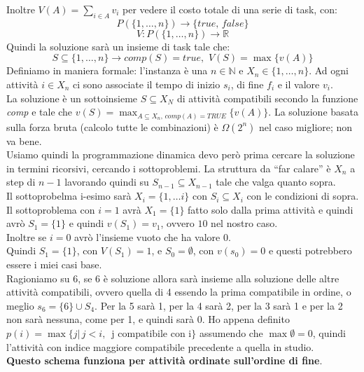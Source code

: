 \documentclass[a4paper,12pt, oneside]{book}
\begin{document}
Inoltre $V(A)=\sum_{i\in A}v_i$ per vedere il costo totale di una
serie di task, con:
\[P(\{1,\ldots, n\})\to \{true,\,false\}\]
\[V:P(\{1,\ldots, n\})\to \mathbb{R}\]
Quindi la soluzione sarà un insieme di task tale che:
\[S\subseteq \{1,\ldots, n\} \to
  comp(S)=true,\,\, V(S)=\max\{v(A)\}\]
Definiamo in maniera formale:
l'instanza è una $n\in\mathbb{N}$ e $X_n\in\{1,\ldots,n\}$. Ad ogni
attività $i\in X_n$ ci sono associate il tempo di inizio $s_i$, di fine $f_i$
e il valore $v_i$.\\
La soluzione è un sottoinsieme $S\subseteq X_N$ di attività
compatibili secondo la funzione \textit{comp} e tale che
$v(S)=\max_{A\subseteq X_n,\, comp(A)=TRUE}\{v(A)\}$.
La soluzione basata sulla forza bruta (calcolo tutte le combinazioni)
è $\Omega(2^n)$ nel caso migliore; non va bene.\\
Usiamo quindi la programmazione dinamica devo però prima cercare la
soluzione in termini ricorsivi, cercando i sottoproblemi. La struttura
da ``far calare'' è $X_n$ a step di $n-1$ lavorando quindi su
$S_{n-1}\subseteq X_{n-1}$ tale che valga quanto sopra.\\ Il
sottoprobelma i-esimo sarà $X_i=\{1,\ldots i\}$ con $S_i\subseteq X_i$
con le condizioni di sopra.\\
Il sottoproblema con $i=1$ avrà $X_1=\{1\}$ fatto solo dalla prima
attività e quindi avrò $S_1 = \{1\}$ e quindi $v(S_1)= v_1$, ovvero
$10$ nel nostro caso.\\
Inoltre se $i=0$ avrò l'insieme vuoto che ha valore 0. \\
Quindi $S_1 = \{1\}$, con $V(S_1)=1$, e $S_0 = \emptyset$, con
$v(s_0)=0$ e questi potrebbero essere i miei casi base. \\
Ragioniamo su 6, se 6 è soluzione allora sarà insieme alla soluzione
delle altre attività compatibili, ovvero quella di 4 essendo la prima
compatibile in ordine, o meglio $s_6 = \{6\}\cup S_4$. Per la 5 sarà
1, per la 4 sarà 2, per la 3 sarà 1 e per la 2 non sarà nessuna, come per
1, e quindi sarà 0. Ho appena definito $p(i) =\max\{j|\, j< i,\,
\mbox{ j compatibile con i}\}$ assumendo che $\max \emptyset = 0$,
quindi l'attività con indice maggiore compatibile precedente a quella
in studio.\\
\textbf{Questo schema funziona per attività ordinate sull'ordine di
  fine}.\\
\end{document}
